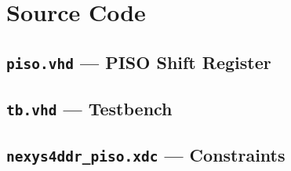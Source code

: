 \documentclass[12pt,a4paper]{report}
\begin{document}
\section{Source Code}

\subsection{\texttt{piso.vhd} --- PISO Shift Register}



\subsection{\texttt{tb.vhd} --- Testbench}



\subsection{\texttt{nexys4ddr\_piso.xdc} --- Constraints}


\end{document}

